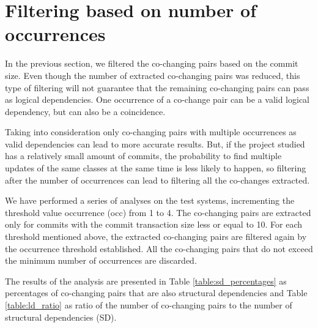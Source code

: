 \documentclass[12pt]{mitthesis}
\begin{document}
\section{Filtering based on number of occurrences}
\label{sec:filterocc}

In the previous section, we filtered the co-changing pairs based on the commit size. Even though the number of extracted co-changing pairs was reduced, this type of filtering will not guarantee that the remaining co-changing pairs can pass as logical dependencies. 
One occurrence of a co-change pair can be a valid logical dependency, but can also be a coincidence. 

Taking into consideration only co-changing pairs with multiple occurrences as valid dependencies can lead to more accurate results. But, if the project studied has a relatively small amount of commits, the probability to find multiple updates of the same classes at the same time is less likely to happen, so filtering after the number of occurrences can lead to filtering all the co-changes extracted.

We have performed a series of analyses on the test systems, incrementing the threshold value occurrence (occ) from 1 to 4. The co-changing pairs are extracted only for commits with the commit transaction size less or equal to 10. For each threshold mentioned above, the extracted co-changing pairs are filtered again by the occurrence threshold established. All the co-changing pairs that do not exceed the minimum number of occurrences are discarded.

The results of the analysis are presented in Table \ref{table:sd_percentages} as percentages of co-changing pairs that are also structural dependencies and Table \ref{table:ld_ratio} as ratio of the number of co-changing pairs to the number of structural dependencies (SD).
\end{document}
